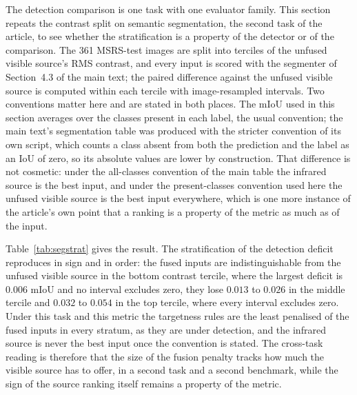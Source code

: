 \documentclass[10pt,a4paper]{article}
\begin{document}
The detection comparison is one task with one evaluator family. This section repeats
the contrast split on semantic segmentation, the second task of the article, to see
whether the stratification is a property of the detector or of the comparison. The
361 MSRS-test images are split into terciles of the unfused visible source's RMS
contrast, and every input is scored with the segmenter of Section~4.3 of the main text;
the paired difference against the unfused visible source is computed within each
tercile with image-resampled intervals. Two conventions matter here and are stated in
both places. The mIoU used in this section averages over the classes present in each
label, the usual convention; the main text's segmentation table was produced with the
stricter convention of its own script, which counts a class absent from both the
prediction and the label as an IoU of zero, so its absolute values are lower by
construction. That difference is not cosmetic: under the all-classes convention of the
main table the infrared source is the best input, and under the present-classes
convention used here the unfused visible source is the best input everywhere, which is
one more instance of the article's own point that a ranking is a property of the metric
as much as of the input.

Table~\ref{tab:segstrat} gives the result. The stratification of the detection deficit
reproduces in sign and in order: the fused inputs are indistinguishable from the
unfused visible source in the bottom contrast tercile, where the largest deficit is
$0.006$ mIoU and no interval excludes zero, they lose $0.013$ to $0.026$ in the middle
tercile and $0.032$ to $0.054$ in the top tercile, where every interval excludes zero.
Under this task and this metric the targetness rules are the least penalised of the
fused inputs in every stratum, as they are under detection, and the infrared source is
never the best input once the convention is stated. The cross-task reading is
therefore that the size of the fusion penalty tracks how much the visible source has to
offer, in a second task and a second benchmark, while the sign of the source ranking
itself remains a property of the metric.
\end{document}
